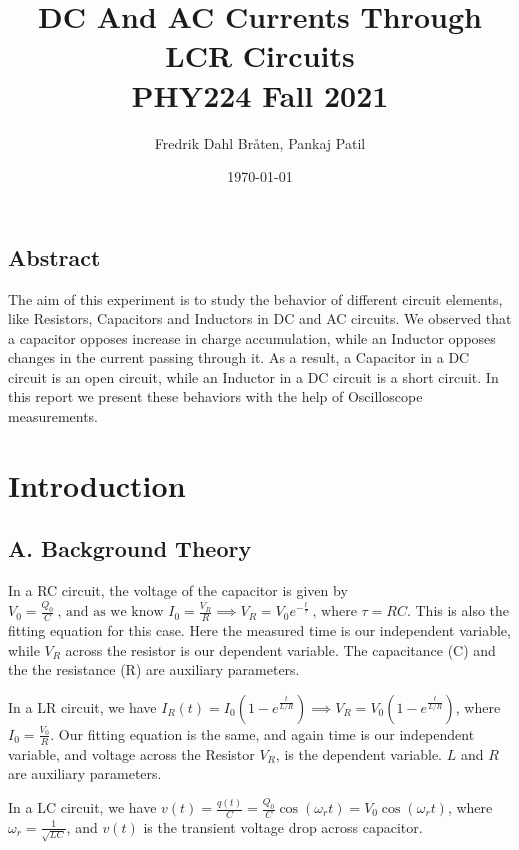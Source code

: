 \documentclass[a4paper,12pt]{article}
\begin{document}
\title{DC And AC Currents Through LCR Circuits \\
\large PHY224 Fall 2021}
\author{Fredrik Dahl Bråten, Pankaj Patil}
\date{\today}
\maketitle
\begin{center}
	\section*{Abstract}
\end{center}
The aim of this experiment is  to study the behavior of different circuit elements, like 
Resistors, Capacitors and Inductors in DC and AC circuits. We observed that a capacitor opposes
increase in charge accumulation, while an Inductor opposes changes in the current passing through it. As a result, a Capacitor in a DC circuit is an open
circuit, while an Inductor in a DC circuit is a short circuit. In this report we present 
these behaviors with the help of Oscilloscope measurements.

\section{Introduction}

\subsection*{A. Background Theory}
In a RC circuit, the voltage of the capacitor is given by $V_0 = \frac{Q_0}{C} \ \text{, and as we know  } I_0 = \frac{V_R}{R} \implies V_R = V_0e^{-\frac{t}{\tau}}\ \text{, where } \tau = RC$. This is also 
the fitting equation for this case. Here the measured time is our independent variable, while $V_R$ across the resistor is our dependent variable. The capacitance (C) and the the resistance (R) are 
auxiliary parameters.

In a LR circuit, we have $I_R(t) = I_0(1-e^{\frac{t}{L/R}}) \implies V_R =  V_0(1-e^{\frac{t}{L/R}})$, where $I_0  = \frac{V_0}{R}$. Our fitting equation is the same, and again time is our 
independent variable, and voltage across the Resistor $V_R$, is the dependent variable. $L$ and $R$ are auxiliary parameters.

In a LC circuit, we have $v(t) = \frac{q(t)}{C} = \frac{Q_0}{C}\cos(\omega_r t) = V_0\cos(\omega_r t)$, where $\omega_r = \frac{1}{\sqrt{LC}}$, and 
$v(t)$ is the transient voltage drop across capacitor.
\end{document}
